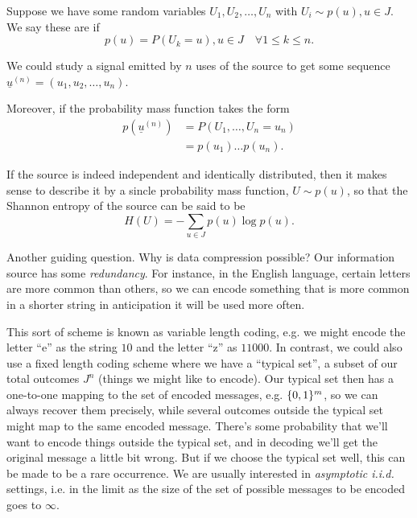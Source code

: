 \begin{defn}
    Suppose we have some random variables $U_1,U_2,\ldots, U_n$ with $U_i \sim p(u),u\in J$. We say these are  if
    \begin{equation*}
        p(u)=P(U_k=u), u\in J \quad \forall 1\leq k \leq n.
    \end{equation*}
\end{defn}
We could study a signal emitted by $n$ uses of the source to get some sequence $\underline{u}^{(n)}=(u_1,u_2,\ldots, u_n)$.
\begin{defn}
    Moreover, if the probability mass function takes the form
    \begin{align*}
        p(\underline{u}^{(n)}) &=P(U_1,\ldots,U_n= u_n)\\
        &= p(u_1)\ldots p(u_n).
    \end{align*}
\end{defn}

If the source is indeed independent and identically distributed, then it makes sense to describe it by a sincle probability mass function, $U\sim p(u)$, so that the Shannon entropy of the source can be said to be
\begin{equation}
    H(U)=-\sum_{u\in J} p(u) \log p(u).
\end{equation}

Another guiding question. Why is data compression possible? Our information source has some \emph{redundancy}. For instance, in the English language, certain letters are more common than others, so we can encode something that is more common in a shorter string in anticipation it will be used more often.

This sort of scheme is known as variable length coding, e.g. we might encode the letter ``e'' as the string $10$ and the letter ``z'' as $11000$. In contrast, we could also use a fixed length coding scheme where we have a ``typical set'', a subset of our total outcomes $J^n$ (things we might like to encode). Our typical set then has a one-to-one mapping to the set of encoded messages, e.g. $\{0,1\}^m$, so we can always recover them precisely, while several outcomes outside the typical set might map to the same encoded message. There's some probability that we'll want to encode things outside the typical set, and in decoding we'll get the original message a little bit wrong. But if we choose the typical set well, this can be made to be a rare occurrence. We are usually interested in \emph{asymptotic i.i.d.} settings, i.e. in the limit as the size of the set of possible messages to be encoded goes to $\infty$.

